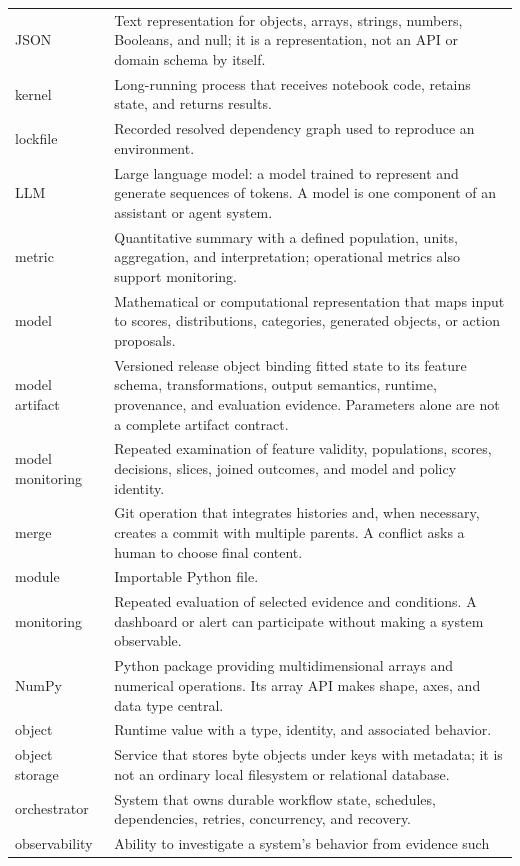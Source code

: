 \begin{longtable}{@{}p{}p{}@{}}
JSON & Text representation for objects, arrays, strings, numbers, Booleans, and
null; it is a representation, not an API or domain schema by itself. \\
kernel & Long-running process that receives notebook code, retains state, and
returns results. \\
lockfile & Recorded resolved dependency graph used to reproduce an environment. \\
LLM & Large language model: a model trained to represent and generate sequences
of tokens. A model is one component of an assistant or agent system. \\
metric & Quantitative summary with a defined population, units, aggregation,
and interpretation; operational metrics also support monitoring. \\
model & Mathematical or computational representation that maps input to
scores, distributions, categories, generated objects, or action proposals. \\
model artifact & Versioned release object binding fitted state to its feature
schema, transformations, output semantics, runtime, provenance, and evaluation
evidence. Parameters alone are not a complete artifact contract. \\
model monitoring & Repeated examination of feature validity, populations,
scores, decisions, slices, joined outcomes, and model and policy identity. \\
merge & Git operation that integrates histories and, when necessary, creates a
commit with multiple parents. A conflict asks a human to choose final content. \\
module & Importable Python file. \\
monitoring & Repeated evaluation of selected evidence and conditions. A
dashboard or alert can participate without making a system observable. \\
NumPy & Python package providing multidimensional arrays and numerical
operations. Its array API makes shape, axes, and data type central. \\
object & Runtime value with a type, identity, and associated behavior. \\
object storage & Service that stores byte objects under keys with metadata;
it is not an ordinary local filesystem or relational database. \\
orchestrator & System that owns durable workflow state, schedules, dependencies,
retries, concurrency, and recovery. \\
observability & Ability to investigate a system's behavior from evidence such

\end{longtable}
